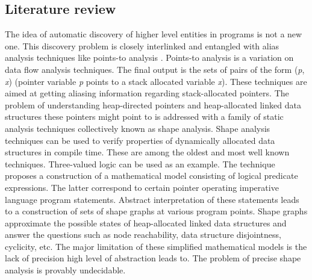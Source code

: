 \subsection{Literature review}
\label{background_dcp_literature_review}
\quad The idea of automatic discovery of higher level entities in programs is not a new one. This discovery problem is closely interlinked and entangled with alias analysis techniques \cite{Muchnick:1998:ACD:286076} like points-to analysis \cite{Emami:1994:CIP:178243.178264}. Points-to analysis is a variation on data flow analysis techniques. The final output is the sets of pairs of the form (\textit{p}, \textit{x}) (pointer variable \textit{p} points to a stack allocated variable \textit{x}). These techniques are aimed at getting aliasing information regarding stack-allocated pointers.\newline\null
\quad The problem of understanding heap-directed pointers and heap-allocated linked data structures these pointers might point to is addressed with a family of static analysis techniques collectively known as shape analysis. Shape analysis techniques can be used to verify properties of dynamically allocated data structures in compile time. These are among the oldest and most well known techniques. Three-valued logic \cite{Sagiv:1999:PSA:292540.292552}\cite{Wilhelm:2000:SA:647476.760384} can be used as an example. The technique proposes a construction of a mathematical model consisting of logical predicate expressions. The latter correspond to certain pointer operating imperative language program statements. Abstract interpretation of these statements leads to a construction of sets of shape graphs at various program points. Shape graphs approximate the possible states of heap-allocated linked data structures and answer the questions such as node reachability, data structure disjointness, cyclicity, etc. The major limitation of these simplified mathematical models is the lack of precision high level of abstraction leads to. The problem of precise shape analysis is provably undecidable.\newline\null
